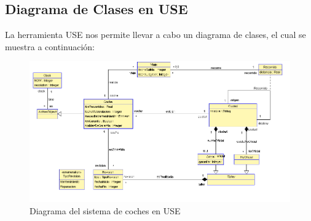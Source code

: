 \documentclass[12pt.a4paper]{article}
\begin{document}
\subsection{Diagrama de Clases en USE}
La herramienta USE nos permite llevar a cabo un diagrama de clases, el cual se muestra a continuación:
\begin{figure}[H]
     \includegraphics[width=1\linewidth]{diagramas/USE_A.png}
     \caption{Diagrama del sistema de coches en USE}
     \label{Diagrama del sistema de coches en USE}
\end{figure}
\vspace{1.0cm}
\end{document}

